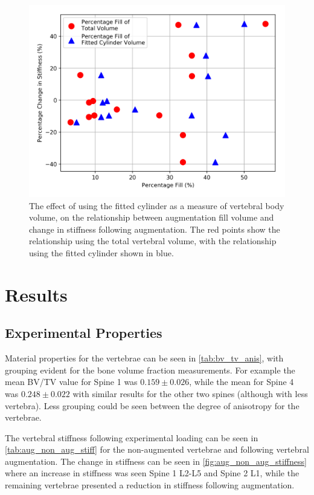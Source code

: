 \begin{figure}[ht!]
  \centering
  \includegraphics[width=.7\textwidth]{Chapters/Chapter_HT_images/cyl_fit_comparison.png}
  \caption{The effect of using the fitted cylinder as a measure of vertebral body volume, on the relationship between augmentation fill volume and change in stiffness following augmentation. The red points show the relationship using the total vertebral volume, with the relationship using the fitted cylinder shown in blue.}
  \label{fig:cyl_fit_comparison}
\end{figure}











\section{Results}


\subsection{Experimental Properties}\label{sec:aug_stiffness_res}

Material properties for the vertebrae can be seen in \cref{tab:bv_tv_anis}, with grouping evident for the bone volume fraction measurements.
For example the mean BV/TV value for Spine 1 was $0.159 \pm 0.026$, while the mean for Spine 4 was $0.248 \pm 0.022$ with similar results for the other two spines (although with less vertebra).
Less grouping could be seen between the degree of anisotropy for the vertebrae.

The vertebral stiffness following experimental loading can be seen in \cref{tab:aug_non_aug_stiff} for the non-augmented vertebrae and following vertebral augmentation.
The change in stiffness can be seen in \cref{fig:aug_non_aug_stiffness} where an increase in stiffness was seen Spine 1 L2-L5 and Spine 2 L1, while the remaining vertebrae presented a reduction in stiffness following augmentation.


